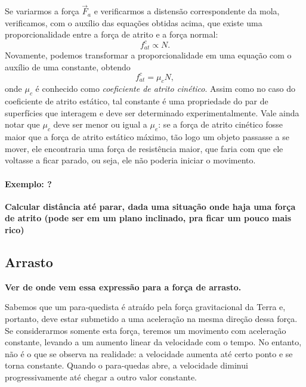 Se variarmos a força $\vec{F}_a$ e verificarmos a distensão correspondente da mola, verificamos, com o auxílio das equações obtidas acima, que existe uma proporcionalidade entre a força de atrito e a força normal:
\begin{equation}
    f_{at}^c \propto N.
\end{equation}
%
Novamente, podemos transformar a proporcionalidade em uma equação com o auxílio de uma constante, obtendo
\begin{equation}
    f_{at}^c = \mu_c N,
\end{equation}
%
onde $\mu_c$ é conhecido como \emph{coeficiente de atrito cinético}. Assim como no caso do coeficiente de atrito estático, tal constante é uma propriedade do par de superfícies que interagem e deve ser determinado experimentalmente. Vale ainda notar que $\mu_c$ deve ser menor ou igual a $\mu_e$: se a força de atrito cinético fosse maior que a força de atrito estático máximo, tão logo um objeto passasse a se mover, ele encontraria uma força de resistência maior, que faria com que ele voltasse a ficar parado, ou seja, ele não poderia iniciar o movimento.

\paragraph{Exemplo: ?}

\textbf{Calcular distância até parar, dada uma situação onde haja uma força de atrito (pode ser em um plano inclinado, pra ficar um pouco mais rico)}

\subsection{Arrasto}

\textbf{Ver de onde vem essa expressão para a força de arrasto.}

Sabemos que um para-quedista é atraído pela força gravitacional da Terra e, portanto, deve estar submetido a uma aceleração na mesma direção dessa força. Se considerarmos somente esta força, teremos um movimento com aceleração constante, levando a um aumento linear da velocidade com o tempo. No entanto, não é o que se observa na realidade: a velocidade aumenta até certo ponto e se torna constante. Quando o para-quedas abre, a velocidade diminui progressivamente até chegar a outro valor constante.

